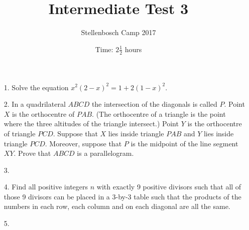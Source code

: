 \documentclass[12pt]{article}
\title{Intermediate Test 3}
\author{Stellenbosch Camp 2017}
\date{Time: $2\frac{1}{2}$ hours}
\begin{document}
 \maketitle

\begin{enumerate}

\item[1.]  %
Solve the equation $x^2(2-x)^2 = 1 + 2(1-x)^2$.


\item[2.] %
In a quadrilateral $ABCD$ the intersection of the diagonals is called $P$. Point $X$ is the orthocentre of $PAB$. (The orthocentre of a triangle is the point where the three altitudes of the triangle intersect.) Point $Y$ is the orthocentre of triangle $PCD$. Suppose that $X$ lies inside triangle $PAB$ and $Y$ lies inside triangle $PCD$. Moreover, suppose that $P$ is the midpoint of the line segment $XY$. Prove that $ABCD$ is a parallelogram.


\item[3.] %


\item[4.] %
Find all positive integers $n$ with exactly 9 positive divisors such that all of those 9 divisors can be placed in a 3-by-3 table such that the products of the numbers in each row, each column and on each diagonal are all the same.


\item[5.] %


\end{enumerate}
\end{document}
